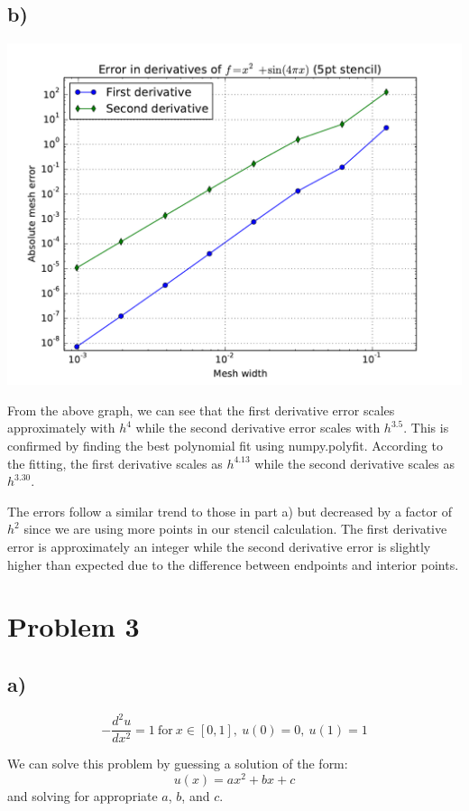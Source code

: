 \documentclass{article}
\begin{document}
\subsection*{b)}
\includegraphics[width=\linewidth]{5PtStencilError.pdf}

From the above graph, we can see that the first derivative error scales approximately with $h^4$ while the second derivative error scales with $h^{3.5}$. This is confirmed by finding the best polynomial fit using numpy.polyfit. According to the fitting, the first derivative scales as $h^{4.13}$ while the second derivative scales as $h^{3.30}$.

The errors follow a similar trend to those in part a) but decreased by a factor of $h^2$ since we are using more points in our stencil calculation. The first derivative error is approximately an integer while the second derivative error is slightly higher than expected due to the difference between endpoints and interior points.

\section*{Problem 3}
\subsection*{a)}
\begin{equation}
-\frac{d^2u}{dx^2}=1\ \mathrm{for}\ x\in[0,1],\ u(0)=0,\ u(1)=1
\end{equation}

We can solve this problem by guessing a solution of the form:
\begin{equation}
u(x)=ax^2+bx+c
\end{equation}
and solving for appropriate $a$, $b$, and $c$.
\end{document}
